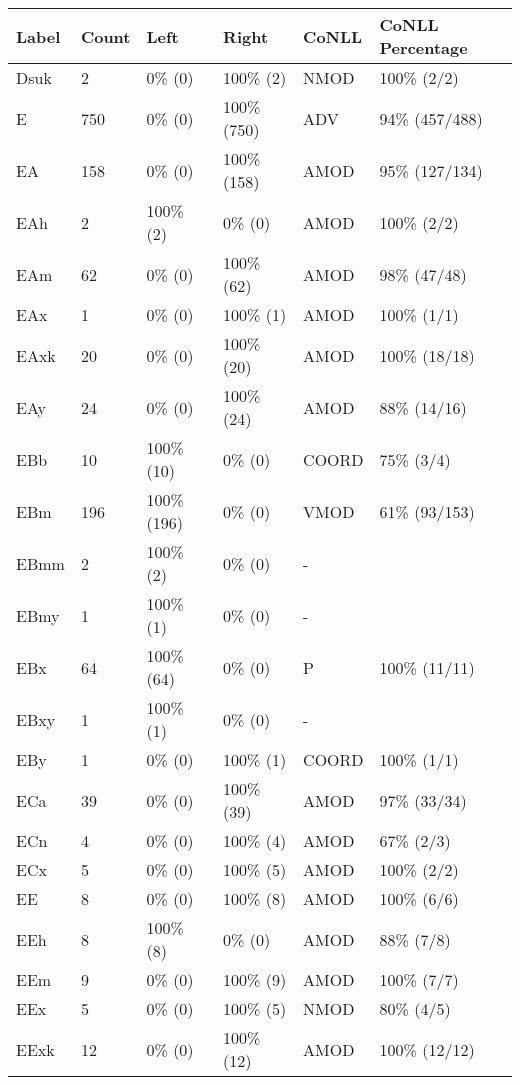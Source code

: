 \begin{figure*}
\begin{tabular}{|l|l|l|l||l|l|}
\hline
Label & Count & Left & Right & CoNLL & CoNLL Percentage\\ 
\hline
 Dsuk & 2 & 0\% (0) & 100\% (2) & NMOD & 100\% (2/2) \\ 
\hline
 E & 750 & 0\% (0) & 100\% (750) & ADV & 94\% (457/488) \\ 
\hline
 EA & 158 & 0\% (0) & 100\% (158) & AMOD & 95\% (127/134) \\ 
\hline
 EAh & 2 & 100\% (2) & 0\% (0) & AMOD & 100\% (2/2) \\ 
\hline
 EAm & 62 & 0\% (0) & 100\% (62) & AMOD & 98\% (47/48) \\ 
\hline
 EAx & 1 & 0\% (0) & 100\% (1) & AMOD & 100\% (1/1) \\ 
\hline
 EAxk & 20 & 0\% (0) & 100\% (20) & AMOD & 100\% (18/18) \\ 
\hline
 EAy & 24 & 0\% (0) & 100\% (24) & AMOD & 88\% (14/16) \\ 
\hline
 EBb & 10 & 100\% (10) & 0\% (0) & COORD & 75\% (3/4) \\ 
\hline
 EBm & 196 & 100\% (196) & 0\% (0) & VMOD & 61\% (93/153) \\ 
\hline
 EBmm & 2 & 100\% (2) & 0\% (0) & - &  \\ 
\hline
 EBmy & 1 & 100\% (1) & 0\% (0) & - &  \\ 
\hline
 EBx & 64 & 100\% (64) & 0\% (0) & P & 100\% (11/11) \\ 
\hline
 EBxy & 1 & 100\% (1) & 0\% (0) & - &  \\ 
\hline
 EBy & 1 & 0\% (0) & 100\% (1) & COORD & 100\% (1/1) \\ 
\hline
 ECa & 39 & 0\% (0) & 100\% (39) & AMOD & 97\% (33/34) \\ 
\hline
 ECn & 4 & 0\% (0) & 100\% (4) & AMOD & 67\% (2/3) \\ 
\hline
 ECx & 5 & 0\% (0) & 100\% (5) & AMOD & 100\% (2/2) \\ 
\hline
 EE & 8 & 0\% (0) & 100\% (8) & AMOD & 100\% (6/6) \\ 
\hline
 EEh & 8 & 100\% (8) & 0\% (0) & AMOD & 88\% (7/8) \\ 
\hline
 EEm & 9 & 0\% (0) & 100\% (9) & AMOD & 100\% (7/7) \\ 
\hline
 EEx & 5 & 0\% (0) & 100\% (5) & NMOD & 80\% (4/5) \\ 
\hline
 EExk & 12 & 0\% (0) & 100\% (12) & AMOD & 100\% (12/12) \\ 

\end{tabular}
\end{figure*}
